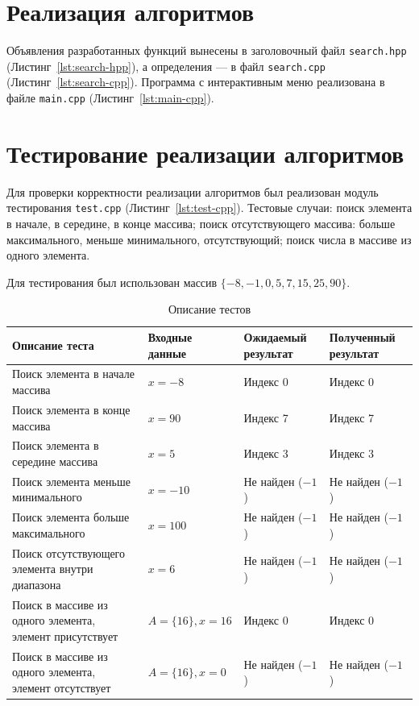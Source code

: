 \documentclass{bmstu}
\begin{document}
\section{Реализация алгоритмов}
Объявления разработанных функций вынесены в заголовочный файл
\texttt{search.hpp} (Листинг~\ref{lst:search-hpp}), а определения --- в файл \texttt{search.cpp} (Листинг~\ref{lst:search-cpp}). Программа
с интерактивным меню реализована в файле \texttt{main.cpp} (Листинг~\ref{lst:main-cpp}).

\section{Тестирование реализации алгоритмов}
Для проверки корректности реализации алгоритмов был реализован модуль
тестирования \texttt{test.cpp} (Листинг~\ref{lst:test-cpp}). Тестовые случаи: поиск элемента в
начале, в середине, в конце массива; поиск отсутствующего массива: больше
максимального, меньше минимального, отсутствующий; поиск числа в массиве из
одного элемента.

Для тестирования был использован массив $\{-8, -1, 0, 5, 7, 15, 25, 90\}$.

\begin{table}[H]
	\centering
	\caption{Описание тестов}
	\label{tab:tests}
	\begin{tabularx}{\textwidth}{|X|X|X|X|}
		\hline
		Описание теста & Входные данные   & Ожидаемый результат &
		Полученный результат                                                       \\ \hline
		Поиск элемента в начале массива
		               & $x=-8$           & Индекс 0            & Индекс 0         \\ \hline
		Поиск элемента в конце массива
		               & $x=90$           & Индекс 7            & Индекс 7         \\ \hline
		Поиск элемента в середине массива
		               & $x=5$            & Индекс 3            & Индекс 3         \\ \hline
		Поиск элемента меньше минимального
		               & $x=-10$          & Не найден ($-1$)    & Не найден ($-1$) \\ \hline
		Поиск элемента больше максимального
		               & $x=100$          & Не найден ($-1$)    & Не найден ($-1$) \\ \hline
		Поиск отсутствующего элемента внутри диапазона
		               & $x=6$            & Не найден ($-1$)    & Не найден ($-1$) \\ \hline
		Поиск в массиве из одного элемента, элемент присутствует
		               & $A=\{16\}, x=16$ & Индекс 0            & Индекс 0         \\ \hline
		Поиск в массиве из одного элемента, элемент отсутствует
		               & $A=\{16\}, x=0$  & Не найден ($-1$)    & Не найден ($-1$) \\ \hline
	\end{tabularx}
\end{table}
\end{document}
